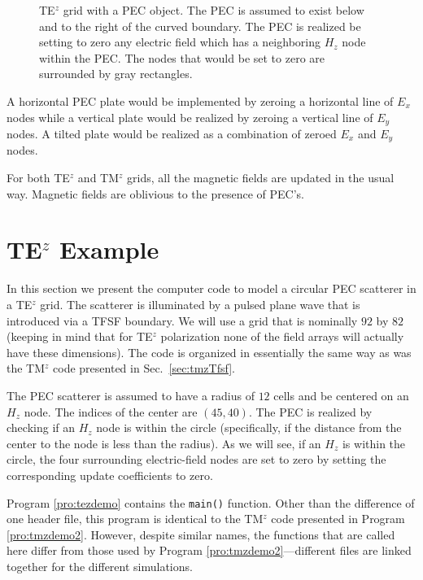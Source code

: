 \begin{figure}
  \begin{center}
  \end{center} \caption{TE$^z$ grid with a PEC object.  The PEC is
  assumed to exist below and to the right of the curved boundary.  The
  PEC is realized be setting to zero any electric field which has a
  neighboring $H_z$ node within the PEC.  The nodes that would be set
  to zero are surrounded by gray rectangles.}  \label{fig:tePec}
\end{figure}

A horizontal PEC plate would be implemented by zeroing a horizontal
line of $E_x$ nodes while a vertical plate would be realized by
zeroing a vertical line of $E_y$ nodes.  A tilted plate would be
realized as a combination of zeroed $E_x$ and $E_y$ nodes.

For both TE$^z$ and TM$^z$ grids, all the magnetic fields are updated
in the usual way.  Magnetic fields are oblivious to the presence of
PEC's.

\section{TE$^z$ Example}

In this section we present the computer code to model a circular PEC
scatterer in a TE$^z$ grid.  The scatterer is illuminated by a pulsed
plane wave that is introduced via a TFSF boundary.  We will use a grid
that is nominally $92$ by $82$ (keeping in mind that for TE$^z$
polarization none of the field arrays will actually have these
dimensions).  The code is organized in essentially the same way as was
the TM$^z$ code presented in Sec.\ \ref{sec:tmzTfsf}.

The PEC scatterer is assumed to have a radius of $12$ cells and be
centered on an $H_z$ node.  The indices of the center are $(45,40)$.
The PEC is realized by checking if an $H_z$ node is within the circle
(specifically, if the distance from the center to the node is less
than the radius).  As we will see, if an $H_z$ is within the circle,
the four surrounding electric-field nodes are set to zero by setting
the corresponding update coefficients to zero.

Program \ref{pro:tezdemo} contains the {\tt main()} function.  Other
than the difference of one header file, this program is identical to
the TM$^z$ code presented in Program \ref{pro:tmzdemo2}.  However,
despite similar names, the functions that are called
here differ from those used by Program \ref{pro:tmzdemo2}---different
files are linked together for the different simulations.

